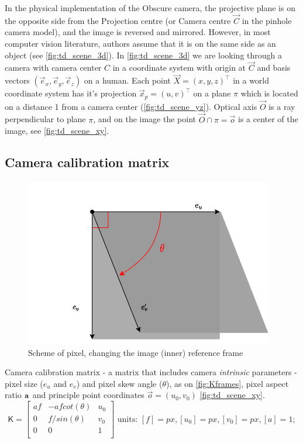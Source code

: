 In the physical implementation of the Obscure camera, the projective plane is on the opposite side from the Projection centre (or Camera centre $\vec{C}$ in the pinhole camera model), and the image is reversed and mirrored. However, in most computer vision literature, authors assume that it is on the same side as an object (see \autoref{fig:td_scene_3d}).
In \autoref{fig:td_scene_3d} we are looking through a camera with camera center $C$ in a coordinate system with origin at $\vec{C}$ and basis vectors $(\vec{e}_x, \vec{e}_y, \vec{e}_z)$ on a human. 
Each point $\vec{X} = (x, y, z)^\top$ in a world coordinate system has it's projection $\vec{x}_p = (u, v)^\top$ on a plane $\pi$ which is located on a distance 1 from a camera center (\autoref{fig:td_scene_yz}). 
Optical axis $\vec{O}$ is a ray perpendicular to plane $\pi$, and on the image the point $ \vec{O} \cap \pi = \vec{o}$ is a center of the image, see \autoref{fig:td_scene_xy}.

\subsection{Camera calibration matrix}
\begin{figure}[h]
    \centering
    \includegraphics[width=.6\textwidth]{graphics/pixel.png}
    \caption{Scheme of pixel, changing the image (inner) reference frame}
    \label{fig:Kframes}
\end{figure}
Camera calibration matrix - a matrix that includes camera \textit{intrinsic} parameters - pixel size ($e_u$ and $e_v$) and pixel skew angle ($\theta$), as on \autoref{fig:Kframes}, pixel aspect ratio $\bf{a}$ and principle point coordinates $\vec{o} = (u_0, v_0)$ \autoref{fig:td_scene_xy}.
\begin{equation}
    \pmb{\mathsf{K}} = \begin{bmatrix}
        af & -a f cot(\theta) & u_0 \\
        0 & f / sin(\theta) & v_0 \\
        0 & 0 & 1 \\
    \end{bmatrix} 
    \textrm{ units: } [f]=px, [u_0]=px, [v_0]=px, [a]=1;
\end{equation}


